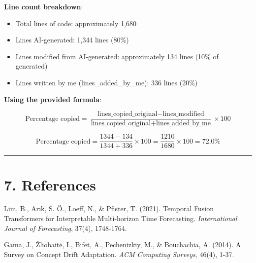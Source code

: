\documentclass[
]{article}
\begin{document}
\textbf{Line count breakdown}:

\begin{itemize}
\item
  Total lines of code: approximately 1,680
\item
  Lines AI-generated: 1,344 lines (80\%)
\item
  Lines modified from AI-generated: approximately 134 lines (10\% of
  generated)
\item
  Lines written by me (lines\_added\_by\_me): 336 lines (20\%)
\end{itemize}

\textbf{Using the provided formula}:

\[\text{Percentage copied} = \frac{\text{lines\_copied\_original} - \text{lines\_modified}}{\text{lines\_copied\_original} + \text{lines\_added\_by\_me}} \times 100\]

\[\text{Percentage copied} = \frac{1344 - 134}{1344 + 336} \times 100 = \frac{1210}{1680} \times 100 = \mathbf{72.0\%}\]

\begin{center}\rule{0.5\linewidth}{0.5pt}\end{center}

\section{7. References}\label{7-references}

Lim, B., Arık, S. Ö., Loeff, N., \& Pfister, T. (2021). Temporal Fusion
Transformers for Interpretable Multi-horizon Time Forecasting.
\emph{International Journal of Forecasting}, 37(4), 1748-1764.

Gama, J., Žliobaitė, I., Bifet, A., Pechenizkiy, M., \& Bouchachia, A.
(2014). A Survey on Concept Drift Adaptation. \emph{ACM Computing
Surveys}, 46(4), 1-37.
\end{document}
